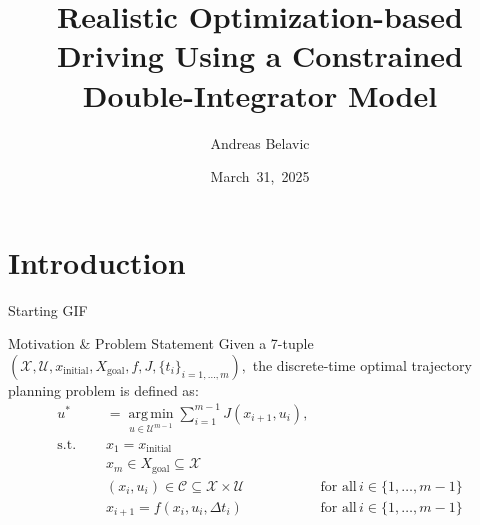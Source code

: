 \documentclass[shortpres,aspectratio=43]{beamer}
\title[Optimization-based Driving]{Realistic Optimization-based Driving Using a Constrained Double-Integrator Model}
\author[Andreas Belavic]{Andreas Belavic}
\institute[TU M\"unchen]{Technical University of Munich}
\date{March~31,~2025}
\begin{document}

\begin{frame}[plain]
  \titlepage
\end{frame}

\section{Introduction}

\begin{frame}
  Starting GIF
\end{frame}

\begin{frame}{Motivation \& Problem Statement}
  Given a 7-tuple
  $
    (\mathcal{X}, \mathcal{U}, x_{\text{initial}}, X_{\text{goal}}, f, J, \{t_i\}_{i=1,\dots ,m}),
  $
  the discrete-time optimal trajectory planning problem is defined as:
  \begin{align}
    u^*     & = \underset{u \in \mathcal{U}^{m-1}}{\operatorname{arg\,min}} \sum_{i=1}^{m-1}
    J(x_{i+1}, u_{i}),                                                                                                                  \\ \text{s.t.
    } \quad & x_1  = x_{\text{initial}}                                                                                                 \\
            & x_m          \in X_{\text{goal}} \subseteq \mathcal{X}                                                                    \\
            & (x_i, u_i)   \in \mathcal{C} \subseteq \mathcal{X} \times \mathcal{U}          & \text{for all}\, i \in \{1, \dots, m-1\} \\
            & x_{i+1}      = f(x_i, u_i, \Delta t_i)                                         & \text{for all}\, i \in \{1, \dots, m-1\}
  \end{align}
\end{frame}
\end{document}
